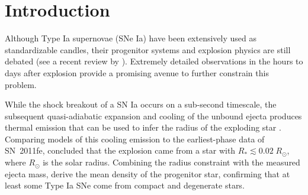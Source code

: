 \documentclass[twocolumn]{aastex61}
\newcommand{\sr}{R_\odot}
\begin{document}

\section{Introduction}
\label{sec:intro}

Although Type Ia supernovae (SNe Ia) have been extensively used as
standardizable candles, their progenitor systems and explosion
physics are still debated (see a recent review by
\citealt{2014ARA&A..52..107M}). Extremely detailed
observations in the hours to days after explosion provide a promising avenue to further constrain this problem.

While the shock breakout of a SN Ia occurs on a sub-second timescale,
the subsequent quasi-adiabatic expansion and cooling of the unbound
ejecta produces thermal emission that can be used to infer the
radius of the exploding star
\citep{2010ApJ...708..598P,2011ApJ...728...63R}. Comparing models of this cooling emission to the earliest-phase data of SN~2011fe,
\citet{2012ApJ...744L..17B} concluded that the explosion came from a star with $R_\ast \lesssim 0.02\;\sr$, where $\sr$ is the solar
radius. Combining the radius constraint with the measured ejecta 
mass, \citeauthor{2012ApJ...744L..17B} derive the mean density of the progenitor star, confirming that at least some Type Ia SNe come from compact and degenerate stars. 
\end{document}
